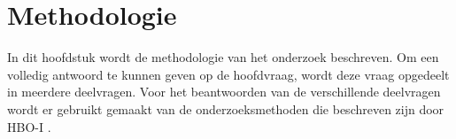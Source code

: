 \section{Methodologie}
In dit hoofdstuk wordt de methodologie van het onderzoek beschreven.
Om een volledig antwoord te kunnen geven op de hoofdvraag, wordt deze vraag opgedeelt in meerdere deelvragen.
Voor het beantwoorden van de verschillende deelvragen wordt er gebruikt gemaakt van de onderzoeksmethoden die beschreven zijn door HBO-I \Parencite{HBO-i-reasearch-methods}.





